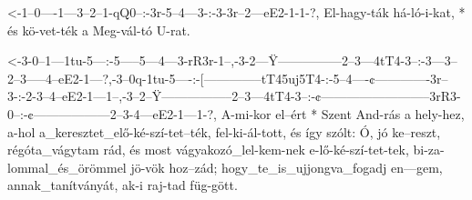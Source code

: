   {<-1--0----1---3--2--1-qQ0--:-3r-5--4---3-:-3-3r--2---eE2-1-1-?,}
  {  El-hagy-ták há-ló-i-kat, * és kö-vet-ték a Meg-vál-tó  U-rat.}

  {<-3-0--1---1tu-5---:-5-----5---4---3-rR3r-1--,-3-2---Ÿ---------------2--3---4tT4-3--:-3---3--2--3-----4--eE2-1---?,-3--0q-1tu-5----:-[--------------tT45uj5T4-:-5--4----¢-------------3r--3-:-2-3--4--eE2-1---1--,-3--2--Ÿ-----------------2--3---4tT4-3--:-¢--------------------------3rR3-0--:-¢------------------2--3-4---eE2-1---1-?,}
  {  A-mi-kor el--ért * Szent And-rás a hely-hez, a-hol a_keresztet_elő-ké-szí-tet--ték, fel-ki-ál-tott, és így szólt: Ó, jó ke--reszt, régóta_vágytam rád,        és most vágyakozó_lel-kem-nek e-lő-ké-szí-tet-tek, bi-za-lommal_és_örömmel jö-vök hoz--zád; hogy_te_is_ujjongva_fogadj en---gem, annak_tanítványát, ak-i raj-tad füg-gött.}